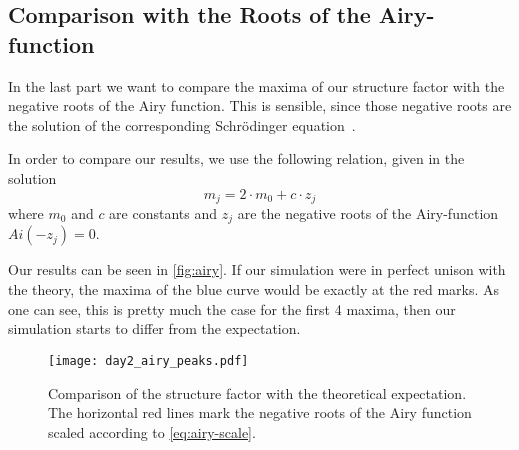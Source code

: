 \newpage
\subsection{Comparison with the Roots of the Airy-function}
In the last part we want to compare the maxima of our structure factor with the negative roots of the Airy function.
This is sensible, since those negative roots are the solution of the corresponding Schrödinger equation~\cite{anleitung}.

In order to compare our results, we use the following relation, given in the solution
\begin{equation}
    m_j = 2\cdot m_0 + c \cdot z_j \label{eq:airy-scale}
\end{equation}
where $m_0$ and $c$ are constants and $z_j$ are the negative roots of the Airy-function $Ai(-z_j) = 0$.

Our results can be seen in \autoref{fig:airy}.
If our simulation were in perfect unison with the theory, the maxima of the blue curve would be exactly at the red marks.
As one can see, this is pretty much the case for the first 4 maxima, then our simulation starts to differ from the expectation.
\begin{figure}[htbp]
    \centering
    \texttt{[image: day2\_airy\_peaks.pdf]}
    \label{fig:airy}
    \caption{Comparison of the structure factor with the theoretical expectation. The horizontal red lines mark the negative roots of the Airy function scaled according to \eqref{eq:airy-scale}.}
\end{figure}
